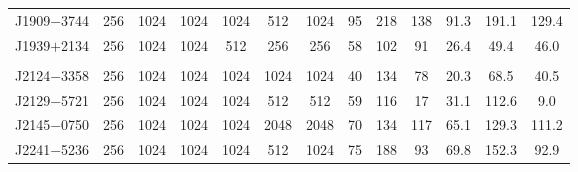 \begin{landscape}
\begin{table}
\begin{center}
\begin{tabular}{lcccccccccccc}
J1909$-$3744&  256    &    1024         &   1024   &  1024   &  512        &  1024    &  95     &  218        & 138      &  91.3   &    191.1         &  129.4   \\ 
J1939$+$2134&  256    &    1024         &   1024   &  512    &  256        &  256     &  58     &  102        & 91       &  26.4   &    49.4          &  46.0    \\ 
						&         &                 &          &         &             &          &         &             &          &         &                  &     \\
J2124$-$3358&  256    &    1024         &   1024   &  1024   &  1024       &  1024    &  40     &  134        & 78       &  20.3   &    68.5          &  40.5    \\ 
J2129$-$5721&  256    &    1024         &   1024   &  1024   &  512        &  512     &  59     &  116        & 17       &  31.1   &    112.6         &  9.0     \\ 
J2145$-$0750&  256    &    1024         &   1024   &  1024   &  2048       &  2048    &  70     &  134        & 117      &  65.1   &    129.3         &  111.2   \\ 
J2241$-$5236&  256    &    1024         &   1024   &  1024   &  512        &  1024    &  75     &  188        & 93       &  69.8   &    152.3         &  92.9   \\ 
\hline
\end{tabular}
\end{center}
\end{table}
\end{landscape}

